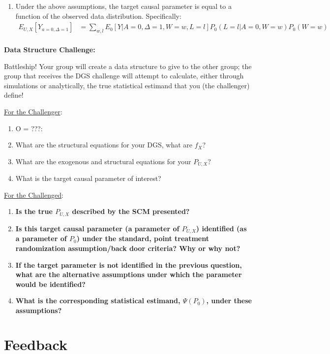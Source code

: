 \documentclass{exam}
\begin{document}
\begin{solution}
\begin{enumerate}
\item Under the above assumptions, the target causal parameter is equal to a function of the observed data distribution. Specifically:
\begin{align*}
E_{U,X}[Y_{a=0, \Delta = 1}] & = \sum_{w, l}E_0[Y|A=0,\Delta=1,W=w,L=l]P_0(L=l|A=0,W=w)P_0(W=w) \\
\end{align*}


\end{enumerate}

\end{solution}

\pagebreak

\pagebreak
\noindent\large\textbf{Data Structure Challenge:}
\normalsize

Battleship! Your group will create a data structure to give to the other group; the group that receives the DGS challenge will attempt to calculate, either through simulations or analytically, the true statistical estimand that you (the challenger) define!

\underline{For the Challenger}:
\begin{enumerate}
\item O = ???:
\item What are the structural equations for your DGS, what are $f_{X}$?
\item What are the exogenous and structural equations for your $P_{U,X}$?
\item What is the target causal parameter of interest? 
\end{enumerate}

\underline{For the Challenged}:
\begin{enumerate}
\item \textbf{Is the true $P_{U,X}$ described by the SCM presented?}
\item \textbf{Is this target causal parameter (a parameter of $P_{U,X}$) identified (as a parameter of $P_0$) under the standard, point treatment randomization assumption/back door criteria? Why or why not?}
\item \textbf{If the target parameter is not identified in the previous question, what are the alternative assumptions under which the parameter would be identified?} 
\item \textbf{What is the corresponding statistical estimand, $\Psi(P_0)$, under these assumptions?}
\end{enumerate}

\section{Feedback}
\end{document}

